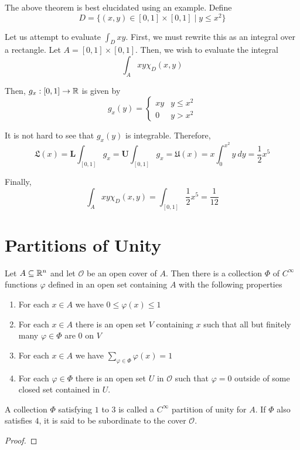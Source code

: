 The above theorem is best elucidated using an example. Define 
\begin{equation*}
    D = \{(x,y)\in[0,1]\times[0,1]\mid y\le x^2\}
\end{equation*}

Let us attempt to evaluate $\int_{D}xy$. First, we must rewrite this as an integral over a rectangle. Let $A = [0,1]\times[0,1]$. Then, we wish to evaluate the integral 
\begin{equation*}
    \int_A xy\chi_D(x,y)
\end{equation*}

Then, $g_x:[0,1]\to\mathbb{R}$ is given by
\begin{equation*}
    g_x(y) = 
    \begin{cases}
        xy & y\le x^2\\
        0 & y > x^2
    \end{cases}
\end{equation*}

It is not hard to see that $g_x(y)$ is integrable. Therefore, 
\begin{equation*}
    \mathfrak{L}(x) = \mathbf{L}\int_{[0,1]}g_x = \mathbf{U}\int_{[0,1]}g_x = \mathfrak{U}(x) = x\int_{0}^{x^2}y~dy = \frac{1}{2}x^5
\end{equation*}

Finally, 
\begin{equation*}
    \int_{A}xy\chi_D(x,y) = \int_{[0,1]}\frac{1}{2}x^5 = \frac{1}{12}
\end{equation*}

\section{Partitions of Unity}

\begin{theorem}
    Let $A\subseteq\mathbb{R}^n$ and let $\mathcal{O}$ be an open cover of $A$. Then there is a collection $\Phi$ of $C^\infty$ functions $\varphi$ defined in an open set containing $A$ with the following properties 
    \begin{enumerate}
        \item For each $x\in A$ we have $0\le\varphi(x)\le 1$ 
        \item For each $x\in A$ there is an open set $V$ containing $x$ such that all but finitely many $\varphi\in\Phi$ are $0$ on $V$ 
        \item For each $x\in A$ we have $\sum_{\varphi\in\Phi}\varphi(x) = 1$ 
        \item For each $\varphi\in\Phi$ there is an open set $U$ in $\mathcal{O}$ such that $\varphi = 0$ outside of some closed set contained in $U$.
    \end{enumerate}

    A collection $\Phi$ satisfying $1$ to $3$ is called a $C^\infty$ partition of unity for $A$. If $\Phi$ also satisfies $4$, it is said to be subordinate to the cover $\mathcal{O}$.
\end{theorem}
\begin{proof}
    
\end{proof}

